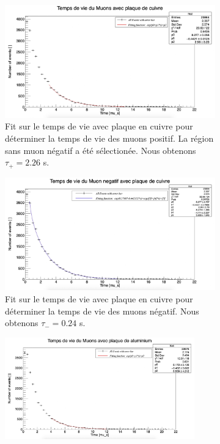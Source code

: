 \documentclass[12pt]{article}
\begin{document}
\begin{landscape}
\begin{figure}[htbp!] 
\centering  
    \begin{subfigure}[t]{.7\textwidth}
    \includegraphics[width=.9\textwidth]{Images/Photos/TauPlusCuivre.jpeg}
    \captionsetup{width=0.8\textwidth}
    \caption{Fit sur le temps de vie avec plaque en cuivre pour déterminer la temps de vie des muons positif. La région sans muon négatif a été sélectionée. Nous obtenons $\tau_{+}=2.26$ \SIUnitSymbolMicro s.}
    \label{fig:TauPlusCuivre}
    \end{subfigure}
    \begin{subfigure}[t]{.7\textwidth}
    \includegraphics[width=.9\textwidth]{Images/Photos/TauMoinsCuivre.jpeg}
    \captionsetup{width=0.8\textwidth}
    \caption{Fit sur le temps de vie avec plaque en cuivre pour déterminer la temps de vie des muons négatif. Nous obtenons $\tau_{-}=0.24$ \SIUnitSymbolMicro s.}
    \label{fig:TauMoinsCuivre}
    \end{subfigure}
    \begin{subfigure}[t]{.7\textwidth}
    \includegraphics[width=0.9\textwidth]{Images/Photos/TauPlusAlu.jpeg}

\end{subfigure}
\end{figure}
\end{landscape}
\end{document}

